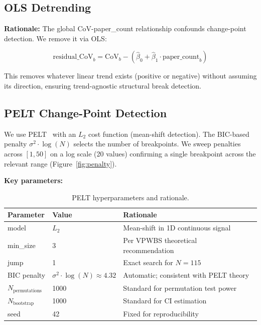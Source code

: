 \subsection{OLS Detrending}

\textbf{Rationale:} The global CoV-paper\_count relationship confounds change-point detection. We remove it via OLS:

\begin{equation}
\text{residual\_CoV}_b = \text{CoV}_b - (\hat{\beta}_0 + \hat{\beta}_1 \cdot \text{paper\_count}_b)
\end{equation}

This removes whatever linear trend exists (positive or negative) without assuming its direction, ensuring trend-agnostic structural break detection.

\subsection{PELT Change-Point Detection}

We use PELT~\cite{Killick2012} with an $L_2$ cost function (mean-shift detection). The BIC-based penalty $\sigma^2 \cdot \log(N)$ selects the number of breakpoints. We sweep penalties across $[1, 50]$ on a log scale (20 values) confirming a single breakpoint across the relevant range (Figure~\ref{fig:penalty}).

\textbf{Key parameters:}

\begin{table}[h]
\centering
\caption{PELT hyperparameters and rationale.}
\label{tab:params}
\begin{tabular}{lll}
\toprule
Parameter & Value & Rationale \\
\midrule
model & $L_2$ & Mean-shift in 1D continuous signal \\
min\_size & 3 & Per VPWBS theoretical recommendation~\cite{Wang2019} \\
jump & 1 & Exact search for $N=115$ \\
BIC penalty & $\sigma^2 \cdot \log(N) \approx 4.32$ & Automatic; consistent with PELT theory \\
$N_{\text{permutations}}$ & 1000 & Standard for permutation test power \\
$N_{\text{bootstrap}}$ & 1000 & Standard for CI estimation \\
seed & 42 & Fixed for reproducibility \\
\bottomrule
\end{tabular}
\end{table}

